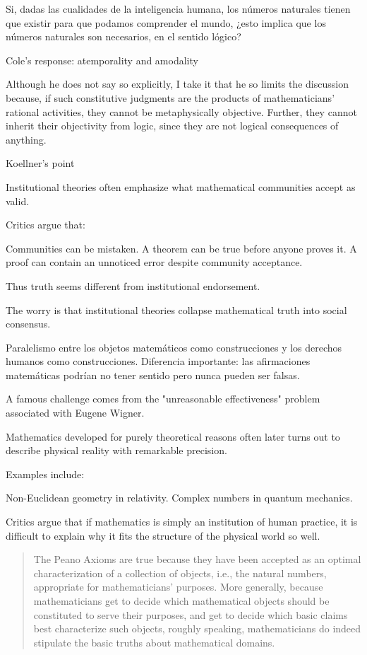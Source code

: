 \documentclass[11pt,a4paper]{article}
\begin{document}
Si, dadas las cualidades de la inteligencia humana, los números naturales tienen que existir para que podamos comprender el mundo, ¿esto implica que los números naturales son necesarios, en el sentido lógico? 

Cole's response: atemporality and amodality

Although he does not say so explicitly, I take it that he so limits the discussion because, if such constitutive judgments are the products of mathematicians' rational activities, they cannot be metaphysically objective. Further, they cannot inherit their objectivity from logic, since they are not logical consequences of anything. \textcite[325]{Dieterle2010}

Koellner's point

Institutional theories often emphasize what mathematical communities accept as valid.

Critics argue that:

Communities can be mistaken.
A theorem can be true before anyone proves it.
A proof can contain an unnoticed error despite community acceptance.

Thus truth seems different from institutional endorsement.

The worry is that institutional theories collapse mathematical truth into social consensus.

Paralelismo entre los objetos matemáticos como construcciones y los derechos humanos como construcciones. Diferencia importante: las afirmaciones matemáticas podrían no tener sentido pero nunca pueden ser falsas. 


A famous challenge comes from the "unreasonable effectiveness" problem associated with Eugene Wigner.

Mathematics developed for purely theoretical reasons often later turns out to describe physical reality with remarkable precision.

Examples include:

Non-Euclidean geometry in relativity.
Complex numbers in quantum mechanics.

Critics argue that if mathematics is simply an institution of human practice, it is difficult to explain why it fits the structure of the physical world so well.

\begin{quote}
The Peano Axioms are true because they have been accepted as an optimal characterization of a collection of objects, i.e., the natural numbers, appropriate for mathematicians' purposes. More generally, because mathematicians get to decide which mathematical objects should be constituted to serve their purposes, and get to decide which basic claims best characterize such objects, roughly speaking, mathematicians do indeed stipulate the basic truths about mathematical domains. \parencite[124]{Cole2008MathematicalDomains}
\end{quote}
\end{document}
